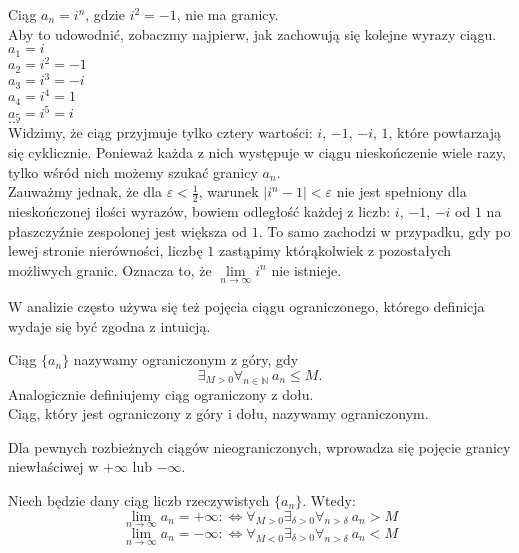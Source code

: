 \begin{przyklad}\label{i^n}
Ciąg $a_n=i^n$, gdzie $i^2=-1$, nie ma granicy. \\
Aby to udowodnić, zobaczmy najpierw, jak zachowują się kolejne wyrazy ciągu.\\
$a_1=i$ \\
$a_2=i^2=-1$\\
$a_3=i^3=-i$\\
$a_4=i^4=1$\\
$a_5=i^5=i$\\
$\dots$\\
Widzimy, że ciąg przyjmuje tylko cztery wartości: $i$, $-1$, $-i$, $1$, które powtarzają się cyklicznie. Ponieważ każda z nich występuje  w ciągu nieskończenie wiele razy, tylko wśród nich możemy szukać granicy $a_n$.\\
Zauważmy jednak, że dla $\varepsilon<\frac{1}{2}$, warunek $|i^n-1|<\varepsilon$ nie jest spełniony dla nieskończonej ilości wyrazów, bowiem odległość każdej z liczb: $i$, $-1$, $-i$ od $1$ na płaszczyźnie zespolonej jest większa od $1$. To samo zachodzi w przypadku, gdy po lewej stronie nierówności, liczbę $1$ zastąpimy którąkolwiek z pozostałych możliwych granic. Oznacza to, że $\lim\limits_{n \to \infty} i^n$ nie istnieje.
\end{przyklad}
W analizie często używa się też pojęcia ciągu ograniczonego, którego definicja wydaje się być zgodna z intuicją.
\begin{definicja}
Ciąg $\{a_{n}\}$ nazywamy ograniczonym z góry, gdy 
\begin{displaymath}
\exists_{M>0}\forall_{n\in \mathbb{N}}\ a_n\leq M.
\end{displaymath}
Analogicznie definiujemy ciąg ograniczony z dołu. 
\\Ciąg, który jest ograniczony z góry i dołu,  nazywamy ograniczonym.
\end{definicja}
Dla pewnych rozbieżnych ciągów nieograniczonych, wprowadza się pojęcie granicy niewłaściwej w $+\infty$ lub $-\infty$.
\begin{definicja}
Niech będzie dany ciąg liczb rzeczywistych $\{a_n\}$. Wtedy:
\begin{displaymath}
\lim_{n \to \infty}{a_n}=+\infty :\iff \forall_{M>0}\exists_{\delta>0}\forall_{n>\delta}\ a_n>M
\end{displaymath}
\begin{displaymath}
\lim_{n \to \infty}{a_n}=-\infty :\iff \forall_{M<0}\exists_{\delta>0}\forall_{n>\delta}\ a_n<M
\end{displaymath}
\end{definicja}
